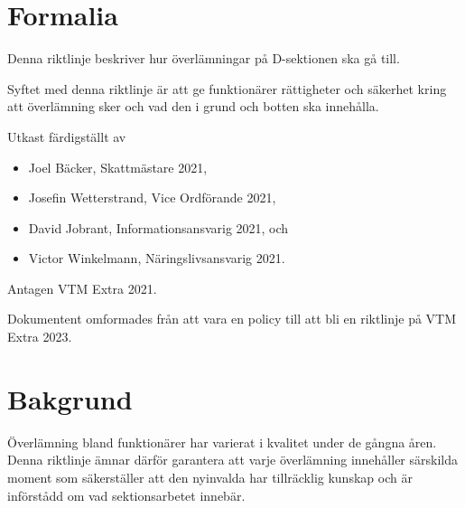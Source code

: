 \documentclass{dsekguideline}
\begin{document}
\maketitle
\section{Formalia}
\begin{parasection}

Denna riktlinje beskriver hur överlämningar på D-sektionen ska gå till.

Syftet med denna riktlinje är att ge funktionärer rättigheter och säkerhet kring
att överlämning sker och vad den i grund och botten ska innehålla.

Utkast färdigställt av
\begin{itemize}
  \item Joel Bäcker, Skattmästare 2021,
  \item Josefin Wetterstrand, Vice Ordförande 2021,
  \item David Jobrant, Informationsansvarig 2021, och
  \item Victor Winkelmann, Näringslivsansvarig 2021.
  \end{itemize}
Antagen VTM Extra 2021.

Dokumentent omformades från att vara en policy till att bli en riktlinje på
VTM Extra 2023.

\end{parasection}

\section{Bakgrund}
\begin{parasection}
  Överlämning bland funktionärer har varierat i kvalitet under de gångna
  åren. Denna riktlinje ämnar därför garantera att varje överlämning innehåller
  särskilda moment som säkerställer att den nyinvalda har tillräcklig kunskap
  och är införstådd om vad sektionsarbetet innebär.
\end{parasection}
\end{document}

